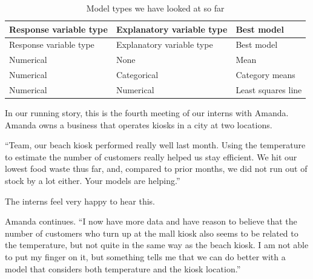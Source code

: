 \documentclass[
  12pt,
  letterpaper,
  DIV=11,
  numbers=noendperiod]{scrreprt}
\begin{document}
\begin{longtable}[]{@{}
  >{\raggedright\arraybackslash}p{}
  >{\raggedright\arraybackslash}p{}
  >{\raggedright\arraybackslash}p{}@{}}
\caption{Model types we have looked at so
far}\label{tbl-first-three-model-types-generic}\tabularnewline
\toprule\noalign{}
\begin{minipage}[b]{\linewidth}\raggedright
Response variable type
\end{minipage} & \begin{minipage}[b]{\linewidth}\raggedright
Explanatory variable type
\end{minipage} & \begin{minipage}[b]{\linewidth}\raggedright
Best model
\end{minipage} \\
\midrule\noalign{}
\endfirsthead
\toprule\noalign{}
\begin{minipage}[b]{\linewidth}\raggedright
Response variable type
\end{minipage} & \begin{minipage}[b]{\linewidth}\raggedright
Explanatory variable type
\end{minipage} & \begin{minipage}[b]{\linewidth}\raggedright
Best model
\end{minipage} \\
\midrule\noalign{}
\endhead
\bottomrule\noalign{}
\endlastfoot
Numerical & None & Mean \\
Numerical & Categorical & Category means \\
Numerical & Numerical & Least squares line \\
\end{longtable}

In our running story, this is the fourth meeting of our interns with
Amanda. Amanda owns a business that operates kiosks in a city at two
locations.

``Team, our beach kiosk performed really well last month. Using the
temperature to estimate the number of customers really helped us stay
efficient. We hit our lowest food waste thus far, and, compared to prior
months, we did not run out of stock by a lot either. Your models are
helping.''

The interns feel very happy to hear this.

Amanda continues. ``I now have more data and have reason to believe that
the number of customers who turn up at the mall kiosk also seems to be
related to the temperature, but not quite in the same way as the beach
kiosk. I am not able to put my finger on it, but something tells me that
we can do better with a model that considers both temperature and the
kiosk location.''
\end{document}
